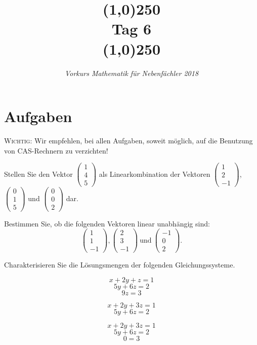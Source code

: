 \documentclass[11pt]{article}
\begin{document}
\title{\line(1,0){250}\\Tag 6\\\line(1,0){250}}
\date{}
\author{\itshape Vorkurs Mathematik für Nebenfächler 2018}
\maketitle

\section*{Aufgaben}
\textsc{Wichtig:} Wir empfehlen, bei allen Aufgaben, soweit möglich, auf die Benutzung von CAS-Rechnern zu verzichten!
\begin{task}
	Stellen Sie den Vektor $\begin{pmatrix}1\\4\\5\end{pmatrix}$ als Linearkombination der Vektoren 
	$\begin{pmatrix}1\\2\\-1\end{pmatrix}$, $\begin{pmatrix}0\\1\\5\end{pmatrix}$ und $\begin{pmatrix}0\\0\\2\end{pmatrix}$ dar.
\end{task}
\begin{task}
Bestimmen Sie, ob die folgenden Vektoren linear unabh\" angig sind:
		\[\begin{pmatrix}1\\1\\-1 \end{pmatrix},
		\begin{pmatrix}2\\ 3\\-1 \end{pmatrix}~\text{und}~
		\begin{pmatrix}-1\\ 0\\2 \end{pmatrix}.\]
\end{task}
\begin{task}
	Charakterisieren Sie die Lösungsmengen der folgenden Gleichungssysteme.\\
	\begin{minipage}{0.3\textwidth}
		$$ x+2y+z=1$$
		$$ 5y+6z=2$$
		$$9z = 3$$
	\end{minipage}
	\begin{minipage}{0.3\textwidth}
		$$ x+2y+3z=1$$
		$$ 5y+6z=2$$
	\end{minipage}
	\begin{minipage}{0.3\textwidth}
	 $$x+2y+3z=1$$
	 $$5y+6z=2$$
	 $$0=3$$
	\end{minipage}
\end{task}
\end{document}
